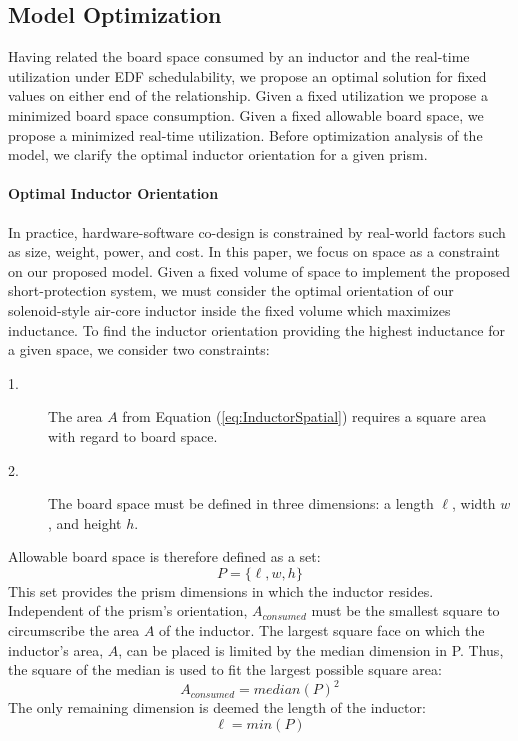 \clearpage \subsection{Model Optimization}\label{subsec:model optimization}
Having related the board space consumed by an inductor and the real-time utilization under EDF schedulability, we propose an optimal solution for fixed values on either end of the relationship. Given a fixed utilization we propose a minimized board space consumption. Given a fixed allowable board space, we propose a minimized real-time utilization. Before optimization analysis of the model, we clarify the optimal inductor orientation for a given prism.

\paragraph{Optimal Inductor Orientation}
In practice, hardware-software co-design is constrained by real-world factors such as size, weight, power, and cost. In this paper, we focus on space as a constraint on our proposed model.
Given a fixed volume of space to implement the proposed short-protection system, we must consider the optimal orientation of our solenoid-style air-core inductor inside the fixed volume which maximizes inductance. 
To find the inductor orientation providing the highest inductance for a given space, we consider two constraints:
\begin{description}
\item [1.] The area $A$ from Equation (\ref{eq:InductorSpatial}) requires a square area with regard to board space.
\item [2.] The board space must be defined in three dimensions: a length $\ell$, width $w$, and height $h$.
\end{description}
Allowable board space is therefore defined as a set:
\begin{equation}\label{eq:Prism}
P = \{\ell,w,h\}
\end{equation}
This set provides the prism dimensions in which the inductor resides. Independent of the prism's orientation, $A_{consumed}$ must be the smallest square to circumscribe the area $A$ of the inductor. The largest square face on which the inductor's area, $A$, can be placed is limited by the median dimension in P. Thus, the square of the median is used to fit the largest possible square area:
\begin{equation}\label{eq:PrismAreaConsumed}
A_{consumed} = median(P)^2
\end{equation}
The only remaining dimension is deemed the length of the inductor:
\begin{equation}\label{eq:PrismLength}
\ell = min(P)
\end{equation}

